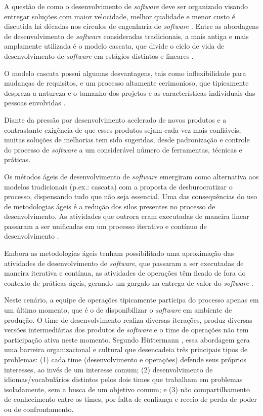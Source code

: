 A questão de como o desenvolvimento de \textit{software} deve ser organizado
visando entregar soluções com maior velocidade, melhor qualidade e menor custo
é discutida há décadas nos círculos de engenharia de \textit{software}
\cite{empirical_studies_agile}. Entre as abordagens de desenvolvimento de
\textit{software} consideradas tradicionais, a mais antiga e mais amplamente
utilizada é o modelo cascata, que divide o ciclo de vida de desenvolvimento
de \textit{software} em estágios distintos e lineares
\cite{software_quality_agile}.

O modelo cascata possui algumas desvantagens, tais como inflexibilidade para
mudanças de requisitos, e um processo altamente cerimonioso, que tipicamente
despreza a natureza e o tamanho dos projetos e as características individuais
das pessoas envolvidas \cite{software_quality_agile}.

Diante da pressão por desenvolvimento acelerado de novos produtos e a
contrastante exigência de que esses produtos sejam cada vez mais confiáveis,
muitas soluções de melhorias tem sido sugeridas, desde padronização e controle
do processo de \textit{software} a um considerável número de ferramentas,
técnicas e práticas.

Os métodos ágeis de desenvolvimento de \textit{software} emergiram como
alternativa aos modelos tradicionais (p.ex.: cascata) com a proposta de
desburocratizar o processo, dispensando tudo que não seja essencial. Uma das
consequências do uso de metodologias ágeis é a redução dos silos presentes no
processo de desenvolvimento. As atividades que outrora eram executadas de
maneira linear passaram a ser unificadas em um processo iterativo e contínuo
de desenvolvimento \cite{a_decade_of_agile}.

Embora as metodologias ágeis tenham possibilitado uma aproximação das
atividades de desenvolvimento de \textit{software}, que passaram a ser
executadas de maneira iterativa e contínua, as atividades de operações têm
ficado de fora do contexto de práticas ágeis, gerando um gargalo na entrega
de valor do \textit{software} \cite{understanding_devops}.

Neste cenário, a equipe de operações tipicamente participa do processo
apenas em um último momento, que é o de disponibilizar o
\textit{software} em ambiente de produção. O time de desenvolvimento realiza
diversas iterações, produz diversas versões intermediárias dos produtos de
\textit{software} e o time de operações não tem participação ativa neste
momento. Segundo H\"uttermann
\cite{devops_for_developers}, essa abordagem gera uma barreira organizacional
e cultural que desencadeia três principais tipos de problemas: (1) cada time
(desenvolvimento e operações) defende seus próprios interesses, ao invés de
um interesse comum; (2) desenvolvimento de idiomas/vocabulários distintos pelos
dois times que trabalham em problemas isoladamente, sem a busca de um objetivo
comum; e (3) não compartilhamento de conhecimento entre os times, por falta
de confiança e receio de perda de poder ou de confrontamento.

